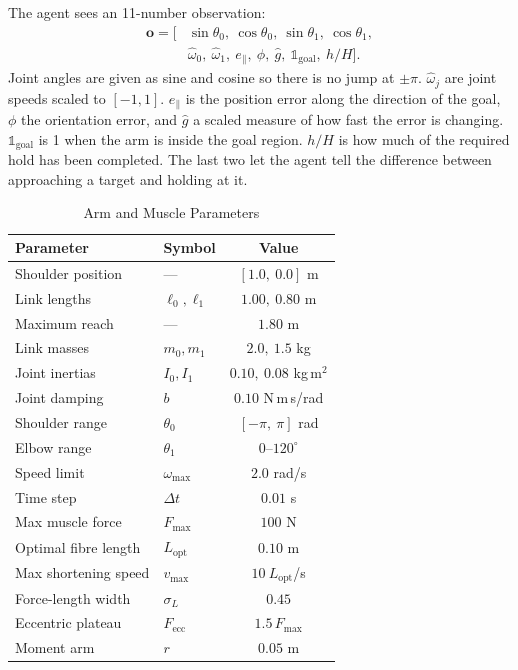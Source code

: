 \documentclass[conference]{IEEEtran}
\begin{document}
The agent sees an 11-number observation:
\begin{equation}
\begin{split}
\mathbf{o} = \big[&\sin\theta_0,\ \cos\theta_0,\ \sin\theta_1,\ \cos\theta_1,\\
&\hat{\omega}_0,\ \hat{\omega}_1,\ e_{\parallel},\ \phi,\ \hat{g},\
\mathbb{1}_{\text{goal}},\ h/H \big].
\end{split}
\label{eq:obs}
\end{equation}
Joint angles are given as sine and cosine so there is no jump at $\pm\pi$.
$\hat{\omega}_j$ are joint speeds scaled to $[-1,1]$. $e_{\parallel}$ is the
position error along the direction of the goal, $\phi$ the orientation error,
and $\hat{g}$ a scaled measure of how fast the error is changing.
$\mathbb{1}_{\text{goal}}$ is 1 when the arm is inside the goal region. $h/H$
is how much of the required hold has been completed. The last two let the agent
tell the difference between approaching a target and holding at it.

\begin{table}[htbp]
\caption{Arm and Muscle Parameters}
\begin{center}
\setlength{\tabcolsep}{4pt}
\begin{tabular}{llc}
\toprule
\textbf{Parameter} & \textbf{Symbol} & \textbf{Value} \\
\midrule
Shoulder position & --- & $[1.0,\ 0.0]$ m \\
Link lengths & $\ell_0, \ell_1$ & $1.00,\ 0.80$ m \\
Maximum reach & --- & $1.80$ m \\
Link masses & $m_0, m_1$ & $2.0,\ 1.5$ kg \\
Joint inertias & $I_0, I_1$ & $0.10,\ 0.08$ kg\,m$^2$ \\
Joint damping & $b$ & $0.10$ N\,m\,s/rad \\
Shoulder range & $\theta_0$ & $[-\pi,\ \pi]$ rad \\
Elbow range & $\theta_1$ & $0$--$120^{\circ}$ \\
Speed limit & $\omega_{\max}$ & $2.0$ rad/s \\
Time step & $\Delta t$ & $0.01$ s \\
\midrule
Max muscle force & $F_{\max}$ & $100$ N \\
Optimal fibre length & $L_{\mathrm{opt}}$ & $0.10$ m \\
Max shortening speed & $v_{\max}$ & $10\ L_{\mathrm{opt}}$/s \\
Force-length width & $\sigma_L$ & $0.45$ \\
Eccentric plateau & $F_{\mathrm{ecc}}$ & $1.5\,F_{\max}$ \\
Moment arm & $r$ & $0.05$ m \\
\bottomrule
\end{tabular}
\label{tab:params}
\end{center}
\end{table}
\end{document}
